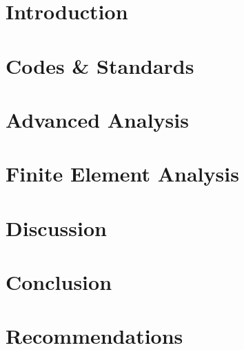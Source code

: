 
\chapter{Introduction}
	

\chapter{Codes \& Standards}
	

\chapter{Advanced Analysis}
	

\chapter{Finite Element Analysis}
	

\chapter{Discussion}
	

\chapter{Conclusion}
	

\chapter{Recommendations}
	

%	